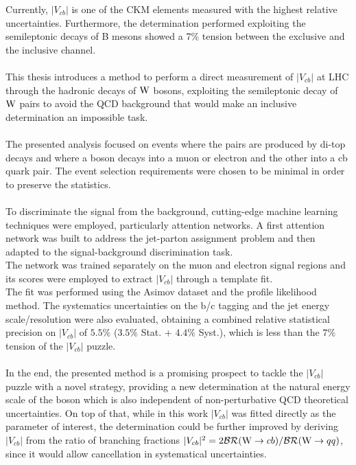 \label{sec:END}
\vspace{-1cm}
Currently, $|V_{cb}|$ is one of the CKM elements measured with the highest relative uncertainties. Furthermore, the determination performed exploiting the semileptonic decays of B mesons showed a 7\% tension between the exclusive and the inclusive channel.\\
\\
This thesis introduces a method to perform a direct measurement of $|V_{cb}|$ at LHC through the hadronic decays of ${\text{W}}$ bosons, exploiting the semileptonic decay of ${\text{W}}$ pairs to avoid the QCD background that would make an inclusive determination an impossible task.
\\
\\
The presented analysis focused on events where the \PW pairs are produced by di-top decays and where a \PW boson decays into a muon or electron and the other into a cb quark pair.
The event selection requirements were chosen to be minimal in order to preserve the statistics.\\
\\
To discriminate the signal from the background, cutting-edge machine learning techniques were employed, particularly attention networks. 
A first attention network was built to address the jet-parton assignment problem and then adapted to the signal-background discrimination task.\\
The network was trained separately on the muon and electron signal regions and its scores were employed to extract $|V_{cb}|$ through a template fit.\\
The fit was performed using the Asimov dataset and the profile likelihood method.
The systematics uncertainties on the b/c tagging and the jet energy scale/resolution were also evaluated, obtaining a combined relative statistical precision on $|V_{cb}|$ of $5.5\%$ ($3.5\%$ Stat. + $4.4\%$ Syst.), which is less than the $7\%$ tension of the $|V_{cb}|$ puzzle.
\\
\\
In the end, the presented method is a promising prospect to tackle the $|V_{cb}|$ puzzle with a novel strategy, providing a new determination at the natural energy scale of the \PW boson which is also independent of non-perturbative QCD theoretical uncertainties.
On top of that, while in this work $|V_{cb}|$ was fitted directly as the parameter of interest, the determination could be further improved by deriving $|V_{cb}|$ from the ratio of branching fractions $|V_{cb}|^2=2\mathcal{BR}({\text{W}} \to cb)/\mathcal{BR}({\text{W}} \to qq)$, since it would allow cancellation in systematical uncertainties.